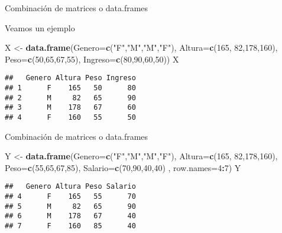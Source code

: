 \documentclass[ignorenonframetext,]{beamer}
\newenvironment{Shaded}{\begin{snugshade}}{\end{snugshade}}
\newcommand{\KeywordTok}[1]{\textcolor[rgb]{0.13,0.29,0.53}{\textbf{#1}}}
\newcommand{\DataTypeTok}[1]{\textcolor[rgb]{0.13,0.29,0.53}{#1}}
\newcommand{\DecValTok}[1]{\textcolor[rgb]{0.00,0.00,0.81}{#1}}
\newcommand{\StringTok}[1]{\textcolor[rgb]{0.31,0.60,0.02}{#1}}
\newcommand{\OperatorTok}[1]{\textcolor[rgb]{0.81,0.36,0.00}{\textbf{#1}}}
\newcommand{\NormalTok}[1]{#1}
\begin{document}
\begin{frame}[fragile]{Combinación de matrices o data.frames}

Veamos un ejemplo

\begin{Shaded}
\begin{Highlighting}[]
\NormalTok{X <-}\StringTok{ }\KeywordTok{data.frame}\NormalTok{(}\DataTypeTok{Genero=}\KeywordTok{c}\NormalTok{(}\StringTok{"F"}\NormalTok{,}\StringTok{"M"}\NormalTok{,}\StringTok{"M"}\NormalTok{,}\StringTok{"F"}\NormalTok{),}
                \DataTypeTok{Altura=}\KeywordTok{c}\NormalTok{(}\DecValTok{165}\NormalTok{, }\DecValTok{82}\NormalTok{,}\DecValTok{178}\NormalTok{,}\DecValTok{160}\NormalTok{),}
                \DataTypeTok{Peso=}\KeywordTok{c}\NormalTok{(}\DecValTok{50}\NormalTok{,}\DecValTok{65}\NormalTok{,}\DecValTok{67}\NormalTok{,}\DecValTok{55}\NormalTok{),}
                \DataTypeTok{Ingreso=}\KeywordTok{c}\NormalTok{(}\DecValTok{80}\NormalTok{,}\DecValTok{90}\NormalTok{,}\DecValTok{60}\NormalTok{,}\DecValTok{50}\NormalTok{))}
\NormalTok{X}
\end{Highlighting}
\end{Shaded}

\begin{verbatim}
##   Genero Altura Peso Ingreso
## 1      F    165   50      80
## 2      M     82   65      90
## 3      M    178   67      60
## 4      F    160   55      50
\end{verbatim}

\end{frame}

\begin{frame}[fragile]{Combinación de matrices o data.frames}

\begin{Shaded}
\begin{Highlighting}[]
\NormalTok{Y <-}\StringTok{ }\KeywordTok{data.frame}\NormalTok{(}\DataTypeTok{Genero=}\KeywordTok{c}\NormalTok{(}\StringTok{"F"}\NormalTok{,}\StringTok{"M"}\NormalTok{,}\StringTok{"M"}\NormalTok{,}\StringTok{"F"}\NormalTok{),}
                \DataTypeTok{Altura=}\KeywordTok{c}\NormalTok{(}\DecValTok{165}\NormalTok{, }\DecValTok{82}\NormalTok{,}\DecValTok{178}\NormalTok{,}\DecValTok{160}\NormalTok{),}
                \DataTypeTok{Peso=}\KeywordTok{c}\NormalTok{(}\DecValTok{55}\NormalTok{,}\DecValTok{65}\NormalTok{,}\DecValTok{67}\NormalTok{,}\DecValTok{85}\NormalTok{),}
                \DataTypeTok{Salario=}\KeywordTok{c}\NormalTok{(}\DecValTok{70}\NormalTok{,}\DecValTok{90}\NormalTok{,}\DecValTok{40}\NormalTok{,}\DecValTok{40}\NormalTok{) ,}
                \DataTypeTok{row.names=}\DecValTok{4}\OperatorTok{:}\DecValTok{7}\NormalTok{)}
\NormalTok{Y}
\end{Highlighting}
\end{Shaded}

\begin{verbatim}
##   Genero Altura Peso Salario
## 4      F    165   55      70
## 5      M     82   65      90
## 6      M    178   67      40
## 7      F    160   85      40
\end{verbatim}

\end{frame}
\end{document}
